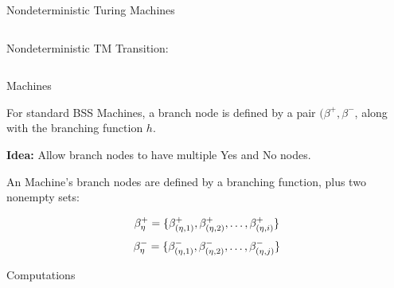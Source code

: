 \documentclass[c]{beamer}
\begin{document}
\begin{frame}{Nondeterministic Turing Machines}

  \begin{columns}

    Nondeterministic TM Transition:
       

    \begin{center}
      \scaletopagewidth{\ndetercomptm{}}
    \end{center}
  \end{columns}
\end{frame}

\begin{frame}{\ndet Machines}

  For standard BSS Machines, a branch node is defined by a pair
  $(\beta^+, \beta^-$, along with the branching function $h$.\pause

  \vspace{\baselineskip}

  \textbf{Idea:} Allow branch nodes to have multiple Yes and No nodes.\pause
  
  \vspace{\baselineskip}

  An \ndet Machine's branch nodes are defined by a branching function,
  plus two nonempty sets:

  $$\beta^+_\eta = \{\beta_{(\eta, 1)}^+, \beta_{(\eta, 2)}^+, \ldots, \beta_{(\eta, i)}^+\}$$
  $$\beta_\eta^- = \{\beta_{(\eta, 1)}^-, \beta_{(\eta, 2)}^-, \ldots, \beta_{(\eta, j)}^-\}$$
\end{frame}

\begin{frame}{\ndet Computations}
  
\end{frame}
\end{document}
